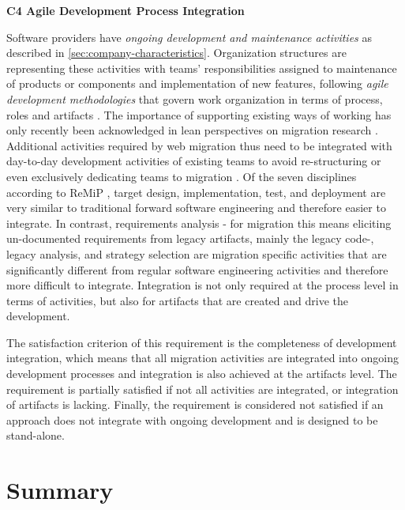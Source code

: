 \textbf{C4 Agile Development Process Integration}

Software providers have \emph{ongoing development and maintenance activities} as described in \cref{sec:company-characteristics}.
Organization structures are representing these activities with teams' responsibilities assigned to maintenance of products or components and implementation of new features, following \emph{agile development methodologies} that govern work organization in terms of process, roles and artifacts \autocite{Beedle2002Scrum}.
The importance of supporting existing ways of working has only recently been acknowledged in lean perspectives on migration research \autocite{Razavian2014a}.
Additional activities required by web migration thus need to be integrated with day-to-day development activities of existing teams to avoid re-structuring or even exclusively dedicating teams to migration \autocites[cf.~\emph{modernization teams} in][]{Krasteva2013REMICSAgile}[\emph{migration factory teams} in][]{AmazonWebServices2018Migration}.
Of the seven disciplines according to ReMiP \autocite{Sneed2010ReMiP,Gipp2007ReMiP}, target design, implementation, test, and deployment are very similar to traditional forward software engineering and therefore easier to integrate.
In contrast, requirements analysis - for migration this means eliciting un-documented requirements from legacy artifacts, mainly the legacy code-, legacy analysis, and strategy selection are migration specific activities that are significantly different from regular software engineering activities and therefore more difficult to integrate.
Integration is not only required at the process level in terms of activities, but also for artifacts that are created and drive the development.

The satisfaction criterion of this requirement is the completeness of development integration, which means that all migration activities are integrated into ongoing development processes and integration is also achieved at the artifacts level.
The requirement is partially satisfied if not all activities are integrated, or integration of artifacts is lacking.
Finally, the requirement is considered not satisfied if an approach does not integrate with ongoing development and is designed to be stand-alone.

\hypertarget{summary}{%
\section{Summary}\label{summary}}

